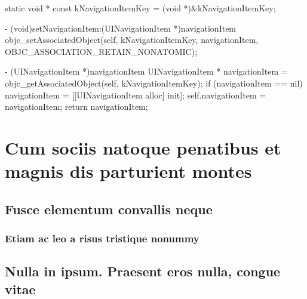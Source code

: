 \documentclass[10pt]{extarticle}
\newenvironment{codelisting}
{\footnotesize\mdframed[middlelinewidth=0.5pt, middlelinecolor=BaliHaiColor, skipabove=15pt]\verbatim}
{\endverbatim\endmdframed\vspace{12pt}\normalsize}
\newenvironment{tiplisting}
{\small\mdframed[middlelinewidth=0.5pt, middlelinecolor=GoldenDreamColor, skipabove=15pt]{\textbf{Tip:}}}
{\endmdframed\vspace{12pt}\normalsize}
\begin{document}
\lipsum[8]

\begin{codelisting}
static void * const kNavigationItemKey = (void *)&kNavigationItemKey;

- (void)setNavigationItem:(UINavigationItem *)navigationItem
{
    objc_setAssociatedObject(self, 
                             kNavigationItemKey, 
                             navigationItem, 
                             OBJC_ASSOCIATION_RETAIN_NONATOMIC);
}

- (UINavigationItem *)navigationItem
{
    UINavigationItem * navigationItem = objc_getAssociatedObject(self, kNavigationItemKey);
    if (navigationItem == nil) {
        navigationItem = [[UINavigationItem alloc] init];
        self.navigationItem = navigationItem;
    }
    return navigationItem;
}
\end{codelisting}

\lipsum[9]

\section{Cum sociis natoque penatibus et magnis dis parturient montes}

\begin{tiplisting}
\lipsum[10-11]
\end{tiplisting}

\subsection{Fusce elementum convallis neque}

\begin{tiplisting}
\lipsum[12-13]
\end{tiplisting}

\subsubsection{Etiam ac leo a risus tristique nonummy}

\begin{tiplisting}
\lipsum[14]
\end{tiplisting}

\subsection{Nulla in ipsum. Praesent eros nulla, congue vitae}

\lipsum[15]
\end{document}
